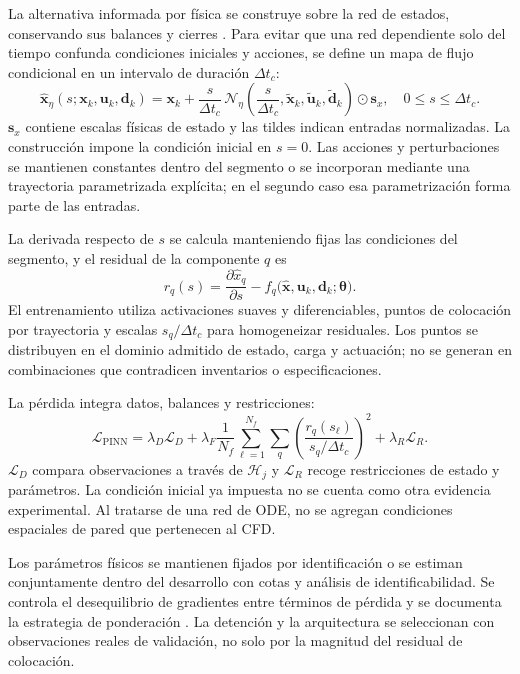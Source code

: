 La alternativa informada por física se construye sobre la red de estados, conservando sus balances y cierres \cite{raissi2019}. Para evitar que una red dependiente solo del tiempo confunda condiciones iniciales y acciones, se define un mapa de flujo condicional en un intervalo de duración $\Delta t_c$:
\begin{equation}
\widehat{\mathbf x}_\eta(s;\mathbf x_k,\mathbf u_k,\mathbf d_k)
=\mathbf x_k+
\frac{s}{\Delta t_c}\,
\mathcal N_\eta\left(
\frac{s}{\Delta t_c},\widetilde{\mathbf x}_k,
\widetilde{\mathbf u}_k,\widetilde{\mathbf d}_k
\right)\odot\mathbf s_x,
\quad 0\leq s\leq\Delta t_c.
\label{met:flujo_pinn}
\end{equation}
$\mathbf s_x$ contiene escalas físicas de estado y las tildes indican entradas normalizadas. La construcción impone la condición inicial en $s=0$. Las acciones y perturbaciones se mantienen constantes dentro del segmento o se incorporan mediante una trayectoria parametrizada explícita; en el segundo caso esa parametrización forma parte de las entradas.

La derivada respecto de $s$ se calcula manteniendo fijas las condiciones del segmento, y el residual de la componente $q$ es
\begin{equation}
r_q(s)=
\frac{\partial\widehat x_q}{\partial s}
-f_q\bigl(
\widehat{\mathbf x},\mathbf u_k,\mathbf d_k;
\boldsymbol\theta
\bigr).
\label{met:residual_pinn}
\end{equation}
El entrenamiento utiliza activaciones suaves y diferenciables, puntos de colocación por trayectoria y escalas $s_q/\Delta t_c$ para homogeneizar residuales. Los puntos se distribuyen en el dominio admitido de estado, carga y actuación; no se generan en combinaciones que contradicen inventarios o especificaciones.

La pérdida integra datos, balances y restricciones:
\begin{equation}
\mathcal L_{\mathrm{PINN}}=
\lambda_D\mathcal L_D+
\lambda_F\frac{1}{N_f}
\sum_{\ell=1}^{N_f}\sum_q
\left(\frac{r_q(s_\ell)}{s_q/\Delta t_c}\right)^2
+\lambda_R\mathcal L_R.
\label{met:perdida_pinn}
\end{equation}
$\mathcal L_D$ compara observaciones a través de $\mathcal H_j$ y $\mathcal L_R$ recoge restricciones de estado y parámetros. La condición inicial ya impuesta no se cuenta como otra evidencia experimental. Al tratarse de una red de ODE, no se agregan condiciones espaciales de pared que pertenecen al CFD.

Los parámetros físicos se mantienen fijados por identificación o se estiman conjuntamente dentro del desarrollo con cotas y análisis de identificabilidad. Se controla el desequilibrio de gradientes entre términos de pérdida y se documenta la estrategia de ponderación \cite{wang2021}. La detención y la arquitectura se seleccionan con observaciones reales de validación, no solo por la magnitud del residual de colocación.

